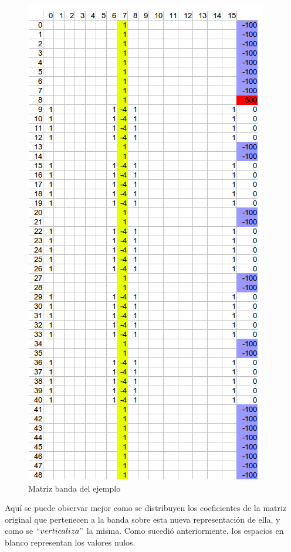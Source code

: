 \begin{figure}
\begin{center}
\includegraphics[scale=0.70]{imagenes/matrizbandaej.png} 
\caption{Matriz banda del ejemplo} 
\end{center}
\end{figure}

\newpage

Aquí se puede observar mejor como se distribuyen los coeficientes de la matriz original que pertenecen a la banda sobre esta nueva representación de ella, y como se $``verticaliza"$ la misma. Como sucedió anteriormente, los espacios en blanco representan los valores nulos.

